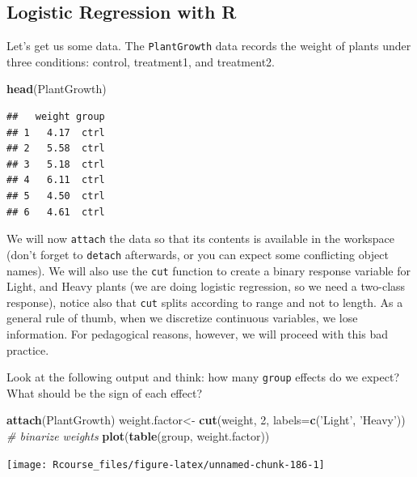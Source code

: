 \documentclass[]{book}
\newenvironment{Shaded}{\begin{snugshade}}{\end{snugshade}}
\newcommand{\CommentTok}[1]{\textcolor[rgb]{0.56,0.35,0.01}{\textit{#1}}}
\newcommand{\DataTypeTok}[1]{\textcolor[rgb]{0.13,0.29,0.53}{#1}}
\newcommand{\DecValTok}[1]{\textcolor[rgb]{0.00,0.00,0.81}{#1}}
\newcommand{\KeywordTok}[1]{\textcolor[rgb]{0.13,0.29,0.53}{\textbf{#1}}}
\newcommand{\NormalTok}[1]{#1}
\newcommand{\StringTok}[1]{\textcolor[rgb]{0.31,0.60,0.02}{#1}}
\theoremstyle{definition}
\theoremstyle{definition}
\theoremstyle{definition}
\theoremstyle{remark}
\begin{document}
\hypertarget{logistic-regression-with-r}{%
\subsection{Logistic Regression with R}\label{logistic-regression-with-r}}

Let's get us some data.
The \texttt{PlantGrowth} data records the weight of plants under three conditions: control, treatment1, and treatment2.

\begin{Shaded}
\begin{Highlighting}[]
\KeywordTok{head}\NormalTok{(PlantGrowth)}
\end{Highlighting}
\end{Shaded}

\begin{verbatim}
##   weight group
## 1   4.17  ctrl
## 2   5.58  ctrl
## 3   5.18  ctrl
## 4   6.11  ctrl
## 5   4.50  ctrl
## 6   4.61  ctrl
\end{verbatim}

We will now \texttt{attach} the data so that its contents is available in the workspace (don't forget to \texttt{detach} afterwards, or you can expect some conflicting object names).
We will also use the \texttt{cut} function to create a binary response variable for Light, and Heavy plants (we are doing logistic regression, so we need a two-class response), notice also that \texttt{cut} splits according to range and not to length.
As a general rule of thumb, when we discretize continuous variables, we lose information.
For pedagogical reasons, however, we will proceed with this bad practice.

Look at the following output and think: how many \texttt{group} effects do we expect? What should be the sign of each effect?

\begin{Shaded}
\begin{Highlighting}[]
\KeywordTok{attach}\NormalTok{(PlantGrowth)}
\NormalTok{weight.factor<-}\StringTok{ }\KeywordTok{cut}\NormalTok{(weight, }\DecValTok{2}\NormalTok{, }\DataTypeTok{labels=}\KeywordTok{c}\NormalTok{(}\StringTok{'Light'}\NormalTok{, }\StringTok{'Heavy'}\NormalTok{)) }\CommentTok{# binarize weights}
\KeywordTok{plot}\NormalTok{(}\KeywordTok{table}\NormalTok{(group, weight.factor))}
\end{Highlighting}
\end{Shaded}

\texttt{[image: Rcourse\_files/figure-latex/unnamed-chunk-186-1]}
\end{document}
